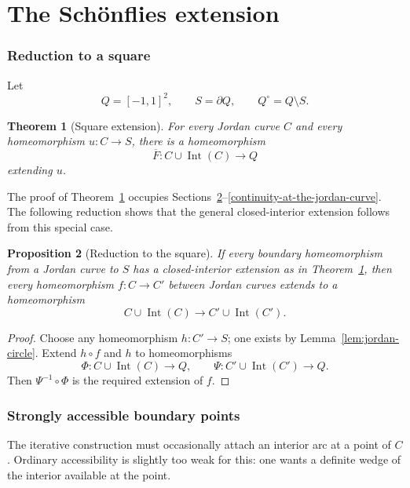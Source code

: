 \documentclass[11pt]{article}
\theoremstyle{mainplain}
\newtheorem{theorem}{Theorem}[section]
\newtheorem{proposition}[theorem]{Proposition}
\theoremstyle{mainroman}
\theoremstyle{definition}
\numberwithin{equation}{section}
\begin{document}
\part{The Schönflies extension}
\section{Reduction to a square}\label{reduction-to-a-square}

Let
\[
Q=[-1,1]^2,\qquad S=\partial Q,\qquad Q^\circ=Q\setminus S.
\]

\begin{theorem}[Square extension]\label{thm:square-extension}
For every Jordan curve $C$ and every homeomorphism $u:C\to S$, there
is a homeomorphism
\[
\overline F:C\cup\operatorname{Int}(C)\longrightarrow Q
\]
extending $u$.
\end{theorem}

The proof of Theorem~\ref{thm:square-extension} occupies
Sections~\ref{strongly-accessible-boundary-points}--\ref{continuity-at-the-jordan-curve}.
The following reduction shows that the general closed-interior
extension follows from this special case.

\begin{proposition}[Reduction to the square]\label{prop:square-reduction}
If every boundary homeomorphism from a Jordan curve to $S$ has a
closed-interior extension as in Theorem~\ref{thm:square-extension}, then every
homeomorphism $f:C\to C'$ between Jordan curves extends to a
homeomorphism
\[
 C\cup\operatorname{Int}(C)
 \longrightarrow
 C'\cup\operatorname{Int}(C').
\]
\end{proposition}
\begin{proof}
Choose any homeomorphism $h:C'\to S$; one exists by
Lemma~\ref{lem:jordan-circle}. Extend $h\circ f$ and $h$ to
homeomorphisms
\[
\Phi:C\cup\operatorname{Int}(C)\longrightarrow Q,
\qquad
\Psi:C'\cup\operatorname{Int}(C')\longrightarrow Q.
\]
Then $\Psi^{-1}\circ\Phi$ is the required extension of $f$.
\end{proof}

\section{Strongly accessible boundary points}\label{strongly-accessible-boundary-points}

The iterative construction must occasionally attach an interior arc at
a point of $C$. Ordinary accessibility is slightly too weak for this:
one wants a definite wedge of the interior available at the point.
\end{document}
